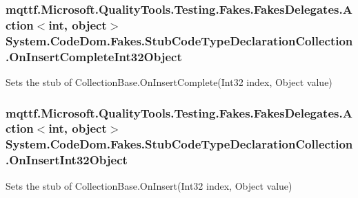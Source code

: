 \hypertarget{class_system_1_1_code_dom_1_1_fakes_1_1_stub_code_type_declaration_collection_a63c7b59ee692cd20e5d4b544921b7430}{
\subsubsection[{On\-Insert\-Complete\-Int32\-Object}]{\setlength{\rightskip}{0pt plus 5cm}mqttf.\-Microsoft.\-Quality\-Tools.\-Testing.\-Fakes.\-Fakes\-Delegates.\-Action$<$int, object$>$ System.\-Code\-Dom.\-Fakes.\-Stub\-Code\-Type\-Declaration\-Collection.\-On\-Insert\-Complete\-Int32\-Object}}\label{class_system_1_1_code_dom_1_1_fakes_1_1_stub_code_type_declaration_collection_a63c7b59ee692cd20e5d4b544921b7430}


Sets the stub of Collection\-Base.\-On\-Insert\-Complete(\-Int32 index, Object value)

\hypertarget{class_system_1_1_code_dom_1_1_fakes_1_1_stub_code_type_declaration_collection_a12644aa36f7a006fce98bf48e240b009}{
\subsubsection[{On\-Insert\-Int32\-Object}]{\setlength{\rightskip}{0pt plus 5cm}mqttf.\-Microsoft.\-Quality\-Tools.\-Testing.\-Fakes.\-Fakes\-Delegates.\-Action$<$int, object$>$ System.\-Code\-Dom.\-Fakes.\-Stub\-Code\-Type\-Declaration\-Collection.\-On\-Insert\-Int32\-Object}}\label{class_system_1_1_code_dom_1_1_fakes_1_1_stub_code_type_declaration_collection_a12644aa36f7a006fce98bf48e240b009}


Sets the stub of Collection\-Base.\-On\-Insert(\-Int32 index, Object value)


